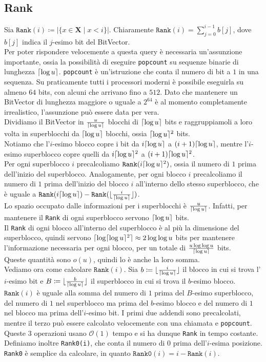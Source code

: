 \documentclass{article}
\DeclarePairedDelimiter\ceil{\lceil}{\rceil}
\DeclarePairedDelimiter\floor{\lfloor}{\rfloor}
\newcommand{\X}{\mathbf{X}}
\newcommand{\ttt}{\texttt}
\newcommand*{\OO}{\ensuremath{\mathcal{O}}}
\newcommand{\clg}[1]{\ensuremath \ceil{\log #1}}
\begin{document}
\subsection{Rank}
Sia $\mathtt{Rank}(i) \coloneq \vert \{x \in \X \mid x < i\} \vert$. Chiaramente $\mathtt{Rank}(i) = \sum_{j = 0}^{i - 1} b[j]$, dove $b[j]$ indica il $j$-esimo bit del BitVector.\\
Per poter rispondere velocemente a questa query \`e necessaria un'assunzione importante, ossia la possibilit\`a di eseguire \ttt{popcount} su sequenze binarie di lunghezza $\clg{u}$. \ttt{popcount} \`e un'istruzione che conta il numero di bit a $1$ in una sequenza. Su praticamente tutti i processori moderni \`e possibile eseguirla su almeno $64$ bits, con alcuni che arrivano fino a $512$. Dato che mantenere un BitVector di lunghezza maggiore o uguale a $2^{64}$ \`e al momento completamente irrealistico, l'assunzione pu\`o essere data per vera.\\
Dividiamo il BitVector in $\frac{u}{\clg{u}}$ blocchi di $\clg{u}$ bits e raggruppiamoli a loro volta in superblocchi da $\clg{u}$ blocchi, ossia $\clg{u}^2$ bits.\\
Notiamo che l'$i$-esimo blocco copre i bit da $i \clg{u}$ a $(i + 1)\clg{u}$, mentre l'$i$-esimo superblocco copre quelli da $i \clg{u}^2$ a $(i + 1)\clg{u}^2$.\\
Per ogni superblocco $i$ precalcoliamo $\mathtt{Rank}(i \clg{u}^2)$, ossia il numero di $1$ prima dell'inizio del superblocco. Analogamente, per ogni blocco $i$ precalcoliamo il numero di $1$ prima dell'inizio del blocco $i$ all'interno dello stesso superblocco, che \`e uguale a $\ttt{Rank}(i \clg{u}) - \ttt{Rank}(\floor{\frac{i}{\clg{u}}})$.\\
Lo spazio occupato dalle informazioni per i superblocchi \`e $\frac{u}{\clg{u}}$. Infatti, per mantenere il \ttt{Rank} di ogni superblocco servono $\clg{u}$ bits.\\
Il \ttt{Rank} di ogni blocco all'interno del superblocco \`e al pi\`u la dimensione del superblocco, quindi servono $\clg{\clg{u}^2} \approx 2 \log \log u$ bits per mantenere l'informazione necessaria per ogni blocco, per un totale di $\frac {u \log \log u}{\clg{u}}$ bits.\\
Queste quantit\`a sono $o(u)$, quindi lo \`e anche la loro somma.\\
Vediamo ora come calcolare $\ttt{Rank}(i)$. Sia $b \coloneq \floor{\frac{i}{\clg{u}}}$ il blocco in cui si trova l'$i$-esimo bit e $B \coloneq \floor{\frac{b}{\clg{u}}}$ il superblocco in cui si trova il $b$-esimo blocco. $\ttt{Rank}(i)$ \`e uguale alla somma del numero di $1$ prima del $B$-esimo superblocco, del numero di $1$ nel superblocco ma prima del $b$-esimo blocco e del numero di $1$ nel blocco ma prima dell'$i$-esimo bit. I primi due addendi sono precalcolati, mentre il terzo pu\`o essere calcolato velocemente con una chiamata e \ttt{popcount}. Queste $3$ operazioni usano $\OO(1)$ tempo e si ha dunque \ttt{Rank} in tempo costante.\\
Definiamo inoltre \ttt{Rank0(i)}, che conta il numero di $0$ prima dell'$i$-esima posizione. \ttt{Rank0} \`e semplice da calcolare, in quanto $\ttt{Rank0}(i) = i - \ttt{Rank}(i)$.
\end{document}
